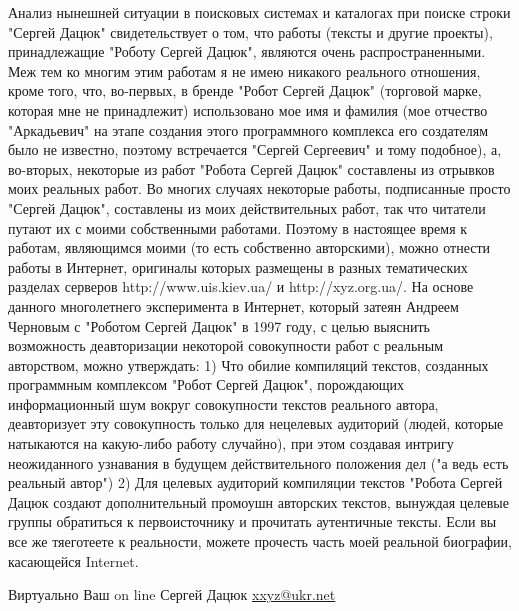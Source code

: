 Анализ нынешней ситуации в поисковых системах и каталогах при поиске строки "Сергей Дацюк" свидетельствует о том, что работы (тексты и другие проекты), принадлежащие "Роботу Сергей Дацюк", являются очень распространенными. Меж тем ко многим этим работам я не имею никакого реального отношения, кроме того, что, во-первых, в бренде "Робот Сергей Дацюк" (торговой марке, которая мне не принадлежит) использовано мое имя и фамилия (мое отчество "Аркадьевич" на этапе создания этого программного комплекса его создателям было не известно, поэтому встречается "Сергей Сергеевич" и тому подобное), а, во-вторых, некоторые из работ "Робота Сергей Дацюк" составлены из отрывков моих реальных работ. Во многих случаях некоторые работы, подписанные просто "Сергей Дацюк", составлены из моих действительных работ, так что читатели путают их с моими собственными работами. Поэтому в настоящее время к работам, являющимся моими (то есть собственно авторскими), можно отнести работы в Интернет, оригиналы которых размещены в разных тематических разделах серверов http://www.uis.kiev.ua/ и http://xyz.org.ua/.
На основе данного многолетнего эксперимента в Интернет, который затеян Андреем Черновым с "Роботом Сергей Дацюк" в 1997 году, с целью выяснить возможность деавторизации некоторой совокупности работ с реальным авторством, можно утверждать:
1) Что обилие компиляций текстов, созданных программным комплексом "Робот Сергей Дацюк", порождающих информационный шум вокруг совокупности текстов реального автора, деавторизует эту совокупность только для нецелевых аудиторий (людей, которые натыкаются на какую-либо работу случайно), при этом создавая интригу неожиданного узнавания в будущем действительного положения дел ("а ведь есть реальный автор")
2) Для целевых аудиторий компиляции текстов "Робота Сергей Дацюк создают дополнительный промоушн авторских текстов, вынуждая целевые группы обратиться к первоисточнику и прочитать аутентичные тексты.
Если вы все же тяеготеете к реальности, можете прочесть часть моей реальной биографии, касающейся Internet.

Виртуально Ваш on line Сергей Дацюк
\url{xxyz@ukr.net}
